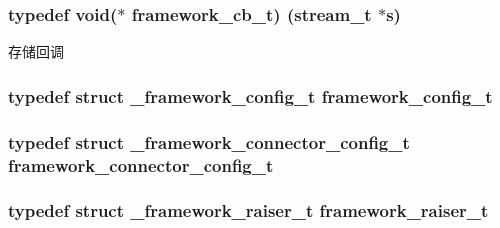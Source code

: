 \subsubsection[{framework\+\_\+cb\+\_\+t}]{\setlength{\rightskip}{0pt plus 5cm}typedef void($\ast$ framework\+\_\+cb\+\_\+t) ({\bf stream\+\_\+t} $\ast$s)}\label{a00051_a4252553890b97d1b0869581b40e11c3e_a4252553890b97d1b0869581b40e11c3e}
存储回调 \hypertarget{a00051_a55b26efa9e6ee05514d087ba2593a54b_a55b26efa9e6ee05514d087ba2593a54b}{}
\subsubsection[{framework\+\_\+config\+\_\+t}]{\setlength{\rightskip}{0pt plus 5cm}typedef struct {\bf \+\_\+framework\+\_\+config\+\_\+t} {\bf framework\+\_\+config\+\_\+t}}\label{a00051_a55b26efa9e6ee05514d087ba2593a54b_a55b26efa9e6ee05514d087ba2593a54b}
\hypertarget{a00051_a81253f4c995b97e69be0e67f7a26097f_a81253f4c995b97e69be0e67f7a26097f}{}
\subsubsection[{framework\+\_\+connector\+\_\+config\+\_\+t}]{\setlength{\rightskip}{0pt plus 5cm}typedef struct {\bf \+\_\+framework\+\_\+connector\+\_\+config\+\_\+t} {\bf framework\+\_\+connector\+\_\+config\+\_\+t}}\label{a00051_a81253f4c995b97e69be0e67f7a26097f_a81253f4c995b97e69be0e67f7a26097f}
\hypertarget{a00051_aa3ac31db191829c9e6db624d660a2563_aa3ac31db191829c9e6db624d660a2563}{}
\subsubsection[{framework\+\_\+raiser\+\_\+t}]{\setlength{\rightskip}{0pt plus 5cm}typedef struct {\bf \+\_\+framework\+\_\+raiser\+\_\+t} {\bf framework\+\_\+raiser\+\_\+t}}\label{a00051_aa3ac31db191829c9e6db624d660a2563_aa3ac31db191829c9e6db624d660a2563}
\hypertarget{a00051_a6149d769f6f07ed14a40a271c95d8463_a6149d769f6f07ed14a40a271c95d8463}{}
